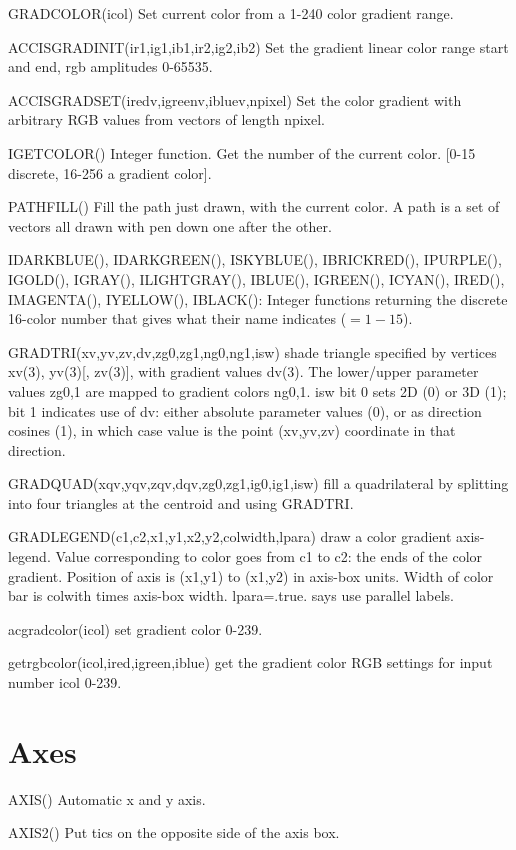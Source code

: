 \documentclass[12pt]{article}
\begin{document}
GRADCOLOR(icol) Set current color from a 1-240 color gradient range.

ACCISGRADINIT(ir1,ig1,ib1,ir2,ig2,ib2) Set the gradient linear color
range start and end, rgb amplitudes 0-65535.

ACCISGRADSET(iredv,igreenv,ibluev,npixel) Set the color gradient with
arbitrary RGB values from vectors of length npixel.

IGETCOLOR() Integer function.  Get the number of the current
color. [0-15 discrete, 16-256 a gradient color].

PATHFILL() Fill the path just drawn, with the current color. A path is
a set of vectors all drawn with pen down one after the other.

IDARKBLUE(), IDARKGREEN(),  ISKYBLUE(),  IBRICKRED(),  IPURPLE(),
IGOLD(),  IGRAY(),  ILIGHTGRAY(),  IBLUE(),  IGREEN(),  ICYAN(),
IRED(),  IMAGENTA(),  IYELLOW(),  IBLACK(): Integer functions returning
the discrete 16-color number that gives what their name indicates ($=1-15$).

GRADTRI(xv,yv,zv,dv,zg0,zg1,ng0,ng1,isw) shade triangle specified by
vertices xv(3), yv(3)[, zv(3)], with gradient values dv(3). The
lower/upper parameter values zg0,1 are mapped to gradient colors
ng0,1. isw bit 0 sets 2D (0) or 3D (1); bit 1 indicates use of dv:
either absolute parameter values (0), or as direction cosines (1), in
which case value is the point (xv,yv,zv) coordinate in that direction.

GRADQUAD(xqv,yqv,zqv,dqv,zg0,zg1,ig0,ig1,isw) fill a quadrilateral 
by splitting into four triangles at the centroid and using GRADTRI. 

GRADLEGEND(c1,c2,x1,y1,x2,y2,colwidth,lpara) draw a color gradient
axis-legend. Value corresponding to color goes from c1 to c2: the ends of
the color gradient. Position of axis is (x1,y1) to (x1,y2) in axis-box
units. Width of color bar is colwith times axis-box
width. lpara=.true. says use parallel labels.

acgradcolor(icol) set gradient color 0-239.

getrgbcolor(icol,ired,igreen,iblue) get the gradient color RGB
settings for input number icol 0-239.

\section{Axes}

AXIS() Automatic x and y axis.

AXIS2() Put tics on the opposite side of the axis box.
\end{document}

